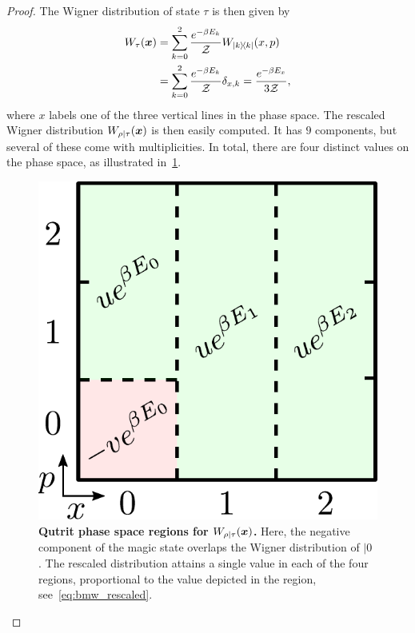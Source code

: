 \begin{proof}
The Wigner distribution of state $\tau$ is then given by
\begin{align}
	\W[\bmx]{\tau} &= \sum\limits_{k=0}^2 \frac{e^{-\beta E_k}}{\Z}W_{\ketbra{k}}(x, p) \nonumber\\
	&= \sum\limits_{k=0}^2 \frac{e^{-\beta E_k}}{\Z} \delta_{x, k} = \frac{e^{-\beta E_x}}{3\Z},
\end{align}
where $x$ labels one of the three vertical lines in the phase space.
The rescaled Wigner distribution $W_{\rho|\tau}(\boldsymbol{x})$ is then easily computed. It has $9$ components, but several of these come with multiplicities. In total, there are four distinct values on the phase space, as illustrated in~\cref{fig:pd_split}.
\begin{figure}[h]
    \centering
    \includegraphics[scale=0.45]{figs/pd_split_thermal.pdf}
    \caption{\textbf{Qutrit phase space regions for $W_{\rho | \tau}(\boldsymbol{x})$.}
    Here, the negative component of the magic state overlaps the Wigner distribution of $|0\>$. The rescaled distribution attains a single value in each of the four regions, proportional to the value depicted in the region, see~\cref{eq:bmw_rescaled}.
    }
    \label{fig:pd_split}
\end{figure}


\end{proof}

